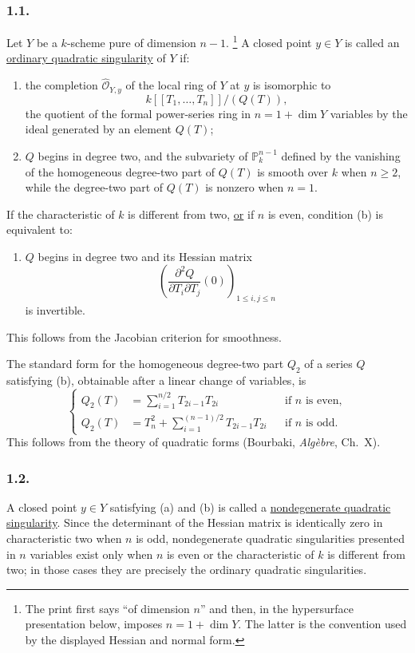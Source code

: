 \subsubsection*{1.1.}
Let $Y$ be a $k$-scheme pure of dimension $n-1$.
\footnote{The print first says ``of dimension $n$'' and then, in the
hypersurface presentation below, imposes $n=1+\dim Y$.  The latter is
the convention used by the displayed Hessian and normal form.}
A closed point $y\in Y$ is called an \underline{ordinary quadratic
singularity} of $Y$ if:
\begin{enumerate}
\item[(a)] the completion $\widehat{\mathcal O}_{Y,y}$ of the local
ring of $Y$ at $y$ is isomorphic to
\[
k[[T_1,\ldots,T_n]]/(Q(T)),
\]
the quotient of the formal power-series ring in
$n=1+\dim Y$ variables by the ideal generated by an element $Q(T)$;
\item[(b)] $Q$ begins in degree two, and the subvariety of
$\mathbb P^{n-1}_k$ defined by the vanishing of the homogeneous
degree-two part of $Q(T)$ is smooth over $k$ when $n\geq2$, while the
degree-two part of $Q(T)$ is nonzero when $n=1$.
\end{enumerate}

If the characteristic of $k$ is different from two, \underline{or} if
$n$ is even, condition (b) is equivalent to:
\begin{enumerate}
\item[(b$'$)] $Q$ begins in degree two and its Hessian matrix
\[
\left(
  \frac{\partial^2Q}{\partial T_i\partial T_j}(0)
\right)_{1\leq i,j\leq n}
\]
is invertible.
\end{enumerate}
This follows from the Jacobian criterion for smoothness.

The standard form for the homogeneous degree-two part $Q_2$ of a
series $Q$ satisfying (b), obtainable after a linear change of
variables, is
\begin{equation}\tag{1.1.1}
\left\{
\begin{aligned}
Q_2(T)&=\sum_{i=1}^{n/2}T_{2i-1}T_{2i}
  &&\text{if $n$ is even},\\[1ex]
Q_2(T)&=T_n^2+\sum_{i=1}^{(n-1)/2}T_{2i-1}T_{2i}
  &&\text{if $n$ is odd}.
\end{aligned}
\right.
\end{equation}
This follows from the theory of quadratic forms (Bourbaki,
\emph{Alg\`ebre}, Ch.~X).

\subsubsection*{1.2.}
A closed point $y\in Y$ satisfying (a) and (b) is called a
\underline{nondegenerate quadratic singularity}.  Since the
determinant of the Hessian matrix is identically zero in
characteristic two when $n$ is odd, nondegenerate quadratic
singularities presented in $n$ variables exist only when $n$ is even
or the characteristic of $k$ is different from two; in those cases
they are precisely the ordinary quadratic singularities.
